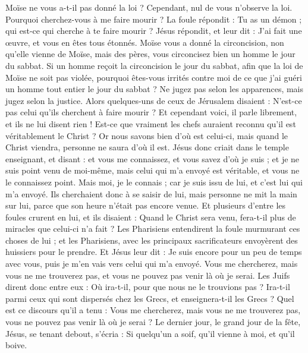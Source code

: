 \begin{multicols}{2}
Moïse ne vous a-t-il pas donné la loi ? Cependant, nul de vous n'observe la loi. Pourquoi cherchez-vous à me faire mourir ?
La foule répondit : Tu as un démon ; qui est-ce qui cherche à te faire mourir ?
Jésus répondit, et leur dit : J'ai fait une œuvre, et vous en êtes tous étonnés.
Moïse vous a donné la circoncision, non qu'elle vienne de Moïse, mais des pères, vous circoncisez bien un homme le jour du sabbat.
Si un homme reçoit la circoncision le jour du sabbat, afin que la loi de Moïse ne soit pas violée, pourquoi êtes-vous irrités contre moi de ce que j'ai guéri un homme tout entier le jour du sabbat ?
Ne jugez pas selon les apparences, mais jugez selon la justice.
Alors quelques-uns de ceux de Jérusalem disaient : N'est-ce pas celui qu'ils cherchent à faire mourir ?
Et cependant voici, il parle librement, et ils ne lui disent rien ! Est-ce que vraiment les chefs auraient reconnu qu'il est véritablement le Christ ?
Or nous savons bien d'où est celui-ci, mais quand le Christ viendra, personne ne saura d'où il est.
Jésus donc criait dans le temple enseignant, et disant : et vous me connaissez, et vous savez d'où je suis ; et je ne suis point venu de moi-même, mais celui qui m'a envoyé est véritable, et vous ne le connaissez point. 
Mais moi, je le connais ; car je suis issu de lui, et c'est lui qui m'a envoyé.
Ils cherchaient donc à se saisir de lui, mais personne ne mit la main sur lui, parce que son heure n'était pas encore venue.
Et plusieurs d'entre les foules crurent en lui, et ils disaient : Quand le Christ sera venu, fera-t-il plus de miracles que celui-ci n'a fait ?
Les Pharisiens entendirent la foule murmurant ces choses de lui ; et les Pharisiens, avec les principaux sacrificateurs envoyèrent des huissiers pour le prendre.
Et Jésus leur dit : Je suis encore pour un peu de temps avec vous, puis je m'en vais vers celui qui m'a envoyé.
Vous me chercherez, mais vous ne me trouverez pas, et vous ne pouvez pas venir là où je serai.
Les Juifs dirent donc entre eux : Où ira-t-il, pour que nous ne le trouvions pas ? Ira-t-il parmi ceux qui sont dispersés chez les Grecs, et enseignera-t-il les Grecs ?
Quel est ce discours qu'il a tenu : Vous me chercherez, mais vous ne me trouverez pas, vous ne pouvez pas venir là où je serai ?
Le dernier jour, le grand jour de la fête, Jésus, se tenant debout, s'écria : Si quelqu'un a soif, qu'il vienne à moi, et qu'il boive.

\end{multicols}
